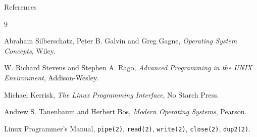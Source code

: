 \documentclass[aspectratio=169]{beamer}
\begin{document}
\begin{frame}{References}

\small

\begin{thebibliography}{9}

Abraham Silberschatz, Peter B. Galvin and Greg Gagne,
\newblock \emph{Operating System Concepts},
\newblock Wiley.

W. Richard Stevens and Stephen A. Rago,
\newblock \emph{Advanced Programming in the UNIX Environment},
\newblock Addison-Wesley.

Michael Kerrisk,
\newblock \emph{The Linux Programming Interface},
\newblock No Starch Press.

Andrew S. Tanenbaum and Herbert Bos,
\newblock \emph{Modern Operating Systems},
\newblock Pearson.

Linux Programmer's Manual,
\newblock \texttt{pipe(2)}, \texttt{read(2)},
\texttt{write(2)}, \texttt{close(2)},
\texttt{dup2(2)}.

\end{thebibliography}

\end{frame}

\end{document}
